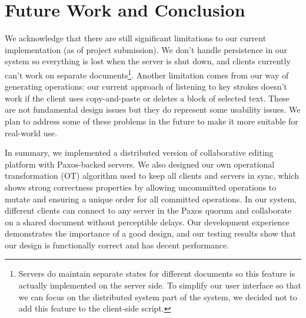 \section{Future Work and Conclusion}

We acknowledge that there are still significant limitations to our current
implementation (as of project submission). We don't handle persistence in our
system so everything is lost when the server is shut down, and clients currently
can't work on separate documents\footnote{Servers do maintain separate states
for different documents so this feature is actually implemented on the server
side. To simplify our user interface so that we can focus on the distributed
system part of the system, we decided not to add this feature to the client-side
script.}. Another limitation comes from our way of generating operations: our
current approach of listening to key strokes doesn't work if the client uses
copy-and-paste or deletes a block of selected text. These are not fundamental
design issues but they do represent some usability issues. We plan to address
some of these problems in the future to make it more suitable for real-world
use.

In summary, we implemented a distributed version of collaborative editing
platform with Paxos-backed servers. We also designed our own operational
transformation (OT) algorithm used to keep all clients and servers in sync,
which shows strong correctness properties by allowing uncommitted operations to
mutate and ensuring a unique order for all committed operations. In our system,
different clients can connect to any server in the Paxos quorum and collaborate
on a shared document without perceptible delays. Our development experience
demonstrates the importance of a good design, and our testing results show that
our design is functionally correct and has decent performance.
